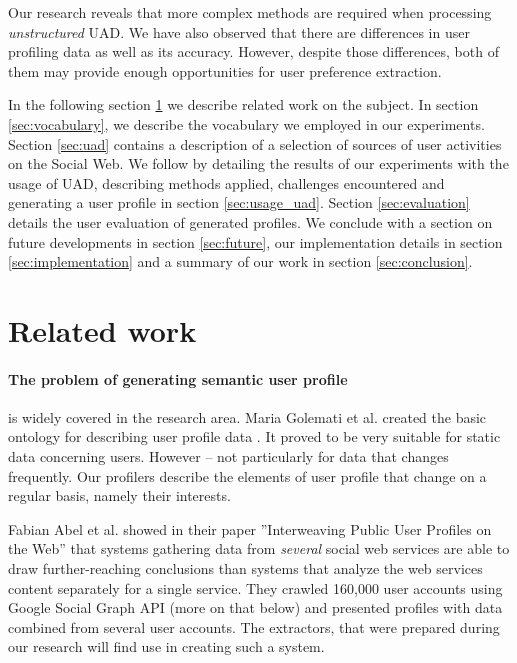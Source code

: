 Our research reveals that more complex methods are required when processing \textit{unstructured} UAD.
We have also observed that there are differences in user profiling data as well as its
accuracy. However, despite those differences, both of them may provide
enough opportunities for user preference extraction.

In the following section \ref{sec:related} we describe related work on the subject.
In section \ref{sec:vocabulary}, we describe the vocabulary we employed in our experiments.
Section \ref{sec:uad} contains a description of a selection of sources
of user activities on the Social Web. We follow by detailing the results of our experiments
with the usage of UAD, describing methods applied, challenges encountered and generating a user profile in
section \ref{sec:usage_uad}. Section \ref{sec:evaluation} details the user evaluation of generated profiles.
We conclude with a section on future developments in section \ref{sec:future}, our implementation details
in section \ref{sec:implementation} and a summary of our work in section \ref{sec:conclusion}.

\section{Related work}
\label{sec:related}

\paragraph{The problem of generating semantic user profile} is widely covered in the
research area. Maria Golemati et al. created the basic ontology for describing
user profile data \cite{creating-ontology-for-user-profile}. It proved to be
very suitable for static data concerning users. However -- not particularly
for data that changes frequently. Our profilers describe the elements of user
profile that change on a regular basis, namely their interests.

Fabian Abel et al. showed in their
paper ''Interweaving Public User Profiles on the Web'' \cite{public-profiles}
that systems gathering data from \textit{several} social web services are
able to draw further-reaching conclusions than systems that analyze the web
services content separately for a single service. They crawled 160,000 user
accounts using Google Social Graph API (more on that below) and presented
profiles with data combined from several user accounts.  The extractors, that
were prepared during our research will find use in creating such a system.

